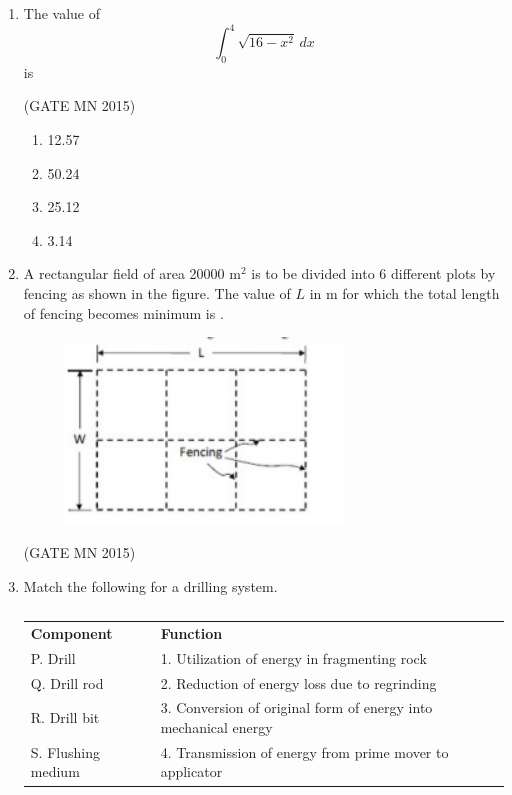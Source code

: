 \documentclass[journal]{IEEEtran}
\begin{document}
\begin{enumerate}
\item The value of 
\[
\int_{0}^{4} \sqrt{16 - x^2} \, dx
\] 
is  

\hfill(GATE MN 2015)
\begin{multicols}{4}
\begin{enumerate}
\item 12.57  
\item 50.24  
\item 25.12  
\item 3.14  
\end{enumerate}
\end{multicols}

\item A rectangular field of area 20000 m$^2$ is to be divided into 6 different plots by fencing as shown in the figure. The value of $L$ in m for which the total length of fencing becomes minimum is \underline{\hspace{2cm}}. 
\begin{figure}[H]                       
\centering            
\includegraphics[width=0.7\textwidth]{Screenshot_2025_0817_214014.png}        
\caption{}          
\label{fig:Q42}   
\end{figure}

\hfill(GATE MN 2015)

\item Match the following for a drilling system.  


\begin{table}[H]
    \centering\normalsize
\begin{tabular}{ll}
	\textbf{Component } & \textbf{Function}\\
P. Drill & 1. Utilization of energy in fragmenting rock \\
Q. Drill rod & 2. Reduction of energy loss due to regrinding \\
R. Drill bit & 3. Conversion of original form of energy into mechanical energy \\
S. Flushing medium & 4. Transmission of energy from prime mover to applicator \\
\end{tabular}
\caption{}
    \label{tab:Q43}
\end{table}


\end{enumerate}
\end{document}
